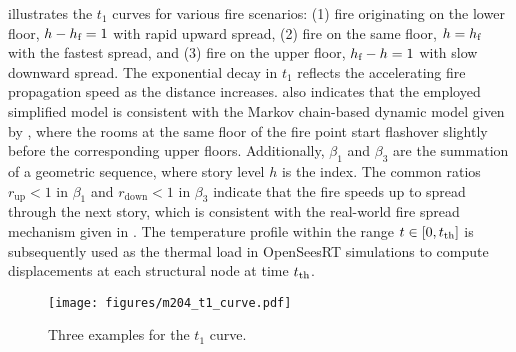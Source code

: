  illustrates the $t_1$ curves for various fire scenarios: (1) fire originating on the lower floor, $h-h_{\text{f}}=1$ with rapid upward spread, (2) fire on the same floor, $h=h_{\text{f}}$ with the fastest spread, and (3) fire on the upper floor, $h_{\text{f}}-h=1$ with slow downward spread. The exponential decay in $t_1$ reflects the accelerating fire propagation speed as the distance increases.  also indicates that the employed simplified model is consistent with the Markov chain-based dynamic model given by \cite{cheng_dynamic_2011}, where the rooms at the same floor of the fire point start flashover slightly before the corresponding upper floors. Additionally, $\beta_{1}$ and $\beta_{3}$ are the summation of a geometric sequence, where story level $h$ is the index. The common ratios $r_{\mathrm{up}}<1$ in $\beta_{1}$ and $r_{\mathrm{down}}<1$ in $\beta_{3}$ indicate that the fire speeds up to spread through the next story, which is consistent with the real-world fire spread mechanism given in \cite{hokugo_mechanism_2000}. The temperature profile within the range $t \in [0, t_{\text{th}}]$ is subsequently used as the thermal load in OpenSeesRT simulations to compute displacements at each structural node at time $t_{\text{th}}$.
\begin{figure}[h!]
    \centering
    \texttt{[image: figures/m204\_t1\_curve.pdf]}
    \caption{Three examples for the $t_1$ curve.}
    \label{fig:t1_curve}
\end{figure}


